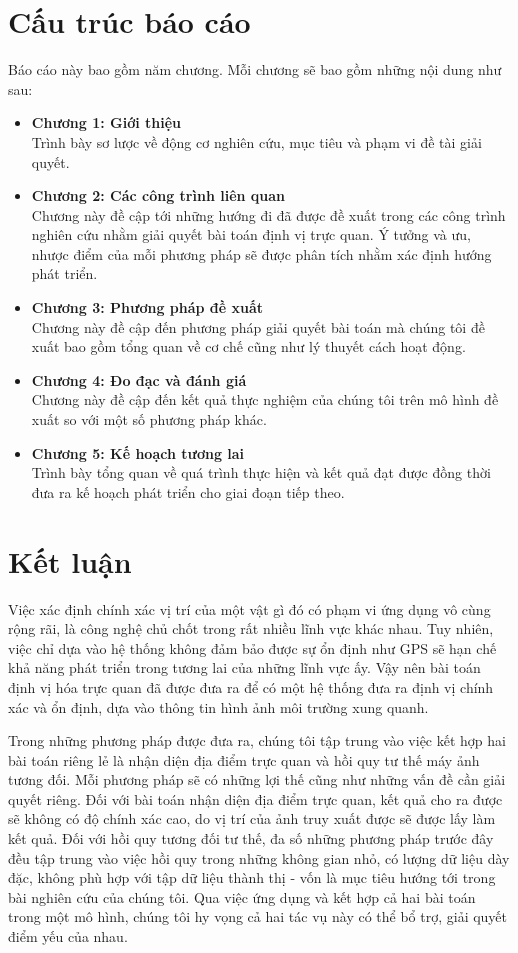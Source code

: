 \section{Cấu trúc báo cáo}
Báo cáo này bao gồm năm chương. Mỗi chương sẽ bao gồm những nội dung như sau:
\begin{itemize}
    \item \textbf{Chương 1: Giới thiệu} \\
          Trình bày sơ lược về động cơ nghiên cứu, mục tiêu và phạm vi đề tài giải quyết.
    \item \textbf{Chương 2: Các công trình liên quan} \\
          Chương này đề cập tới những hướng đi đã được đề xuất trong các công trình nghiên cứu nhằm giải quyết bài toán định vị trực quan. Ý tưởng và ưu, nhược điểm của mỗi phương pháp sẽ được phân tích nhằm xác định hướng phát triển.
    \item \textbf{Chương 3: Phương pháp đề xuất} \\
          Chương này đề cập đến phương pháp giải quyết bài toán mà chúng tôi đề xuất bao gồm tổng quan về cơ chế cũng như lý thuyết cách hoạt động.
    \item \textbf{Chương 4: Đo đạc và đánh giá} \\
          Chương này đề cập đến kết quả thực nghiệm của chúng tôi trên mô hình đề xuất so với một số phương pháp khác. 
    \item \textbf{Chương 5: Kế hoạch tương lai} \\
          Trình bày tổng quan về quá trình thực hiện và kết quả đạt được đồng thời đưa ra kế hoạch phát triển cho giai đoạn tiếp theo.
\end{itemize}
\newpage
\section{Kết luận}
Việc xác định chính xác vị trí của một vật gì đó có phạm vi ứng dụng vô cùng rộng rãi, là công nghệ chủ chốt trong rất nhiều lĩnh vực khác nhau. Tuy nhiên, việc chỉ dựa vào hệ thống không đảm bảo được sự ổn định như GPS sẽ hạn chế khả năng phát triển trong tương lai của những lĩnh vực ấy. Vậy nên bài toán định vị hóa trực quan đã được đưa ra để có một hệ thống đưa ra định vị chính xác và ổn định, dựa vào thông tin hình ảnh môi trường xung quanh.

Trong những phương pháp được đưa ra, chúng tôi tập trung vào việc kết hợp hai bài toán riêng lẻ là nhận diện địa điểm trực quan và hồi quy tư thế máy ảnh tương đối. Mỗi phương pháp sẽ có những lợi thế cũng như những vấn đề cần giải quyết riêng. Đối với bài toán nhận diện địa điểm trực quan, kết quả cho ra được sẽ không có độ chính xác cao, do vị trí của ảnh truy xuất được sẽ được lấy làm kết quả. Đối với hồi quy tương đối tư thế, đa số những phương pháp trước đây đều tập trung vào việc hồi quy trong những không gian nhỏ, có lượng dữ liệu dày đặc, không phù hợp với tập dữ liệu thành thị - vốn là mục tiêu hướng tới trong bài nghiên cứu của chúng tôi. Qua việc ứng dụng và kết hợp cả hai bài toán trong một mô hình, chúng tôi hy vọng cả hai tác vụ này có thể bổ trợ, giải quyết điểm yếu của nhau.


